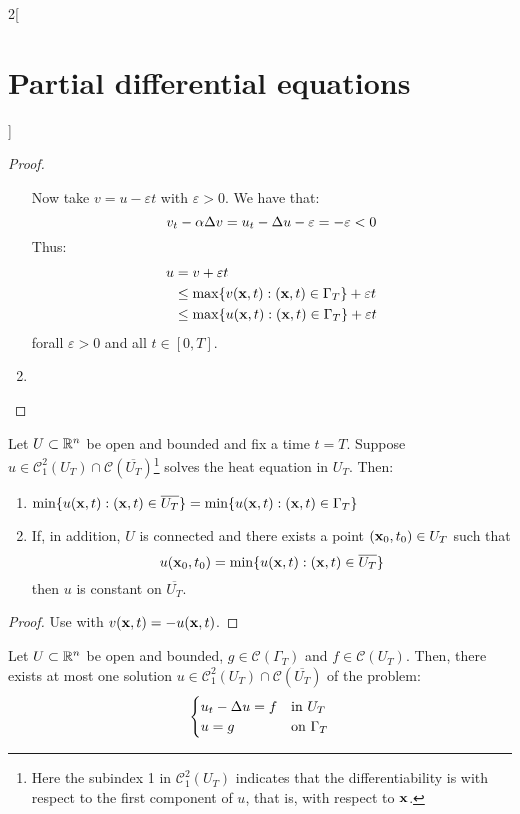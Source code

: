 \documentclass[../../../main_math.tex]{subfiles}
\begin{document}
\begin{multicols}{2}[\section{Partial differential equations}]
\begin{proof}
\begin{enumerate}
            Now take $v=u-\varepsilon t$ with $\varepsilon>0$. We have that: $$v_t-\alpha \Delta v=u_t-\Delta u -\varepsilon = -\varepsilon <0$$
            Thus:
            \begin{align*}
              u & =v+\varepsilon t                                              \\
                & \leq \max\{v(\boldsymbol{\mathrm{x}},t):(\boldsymbol{\mathrm{x}},t)\in\Gamma_T\} +\varepsilon t \\
                & \leq \max\{u(\boldsymbol{\mathrm{x}},t):(\boldsymbol{\mathrm{x}},t)\in\Gamma_T\} +\varepsilon t
            \end{align*}
            forall $\varepsilon >0$ and all $t\in[0,T]$.
      \item
    \end{enumerate}
  \end{proof}
  \begin{theorem}
    Let $U\subset\mathbb{R}^n$ be open and bounded and fix a time $t=T$. Suppose $u\in\mathcal{C}_1^2(U_T)\cap\mathcal{C}(\overline{U_T})$\footnote{Here the subindex 1 in $\mathcal{C}_1^2(U_T)$ indicates that the differentiability is with respect to the first component of $u$, that is, with respect to $\boldsymbol{\mathrm{x}}$.} solves the heat equation in $U_T$. Then:
    \begin{enumerate}
      \item $\displaystyle\min\{u(\boldsymbol{\mathrm{x}},t):(\boldsymbol{\mathrm{x}},t)\in\overline{U_T}\}=\min\{u(\boldsymbol{\mathrm{x}},t):(\boldsymbol{\mathrm{x}},t)\in\Gamma_T\}$
      \item If, in addition, $U$ is connected and there exists a point $(\boldsymbol{\mathrm{x}}_0, t_0)\in U_T$ such that $$u(\boldsymbol{\mathrm{x}}_0,t_0)=\min\{u(\boldsymbol{\mathrm{x}},t):(\boldsymbol{\mathrm{x}},t)\in\overline{U_T}\}$$ then $u$ is constant on $\overline{U_T}$.
    \end{enumerate}
  \end{theorem}
  \begin{proof}
    Use  with $v(\boldsymbol{\mathrm{x}},t)=-u(\boldsymbol{\mathrm{x}},t)$.
  \end{proof}
  \begin{theorem}
    Let $U\subset\mathbb{R}^n$ be open and bounded, $g\in\mathcal{C}(\Gamma_T)$ and $f\in\mathcal{C}(U_T)$. Then, there exists at most one solution $u\in\mathcal{C}_1^2(U_T)\cap\mathcal{C}(\overline{U_T})$ of the problem:
    $$
      \begin{cases}
        u_{t}  -\Delta{u} = f & \text{in $U_T$}      \\
        u=g                       & \text{on $\Gamma_T$}
      \end{cases}
$$
\end{theorem}
\end{multicols}
\end{document}
